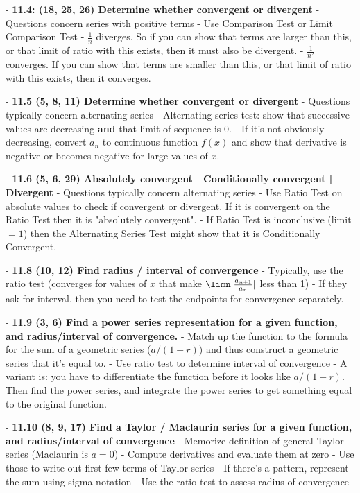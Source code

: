 - \textbf{11.4: (18, 25, 26) Determine whether convergent or divergent}
- Questions concern series with positive terms
- Use Comparison Test or Limit Comparison Test
- $\frac{1}{n}$ diverges. So if you can show that terms are larger than this, or that limit of ratio with this exists, then it must also be divergent.
- $\frac{1}{n^2}$ converges. If you can show that terms are smaller than this, or that limit of ratio with this exists, then it converges.

- \textbf{11.5 (5, 8, 11) Determine whether convergent or divergent}
- Questions typically concern alternating series
- Alternating series test: show that successive values are decreasing \textbf{and} that limit of sequence is 0.
- If it's not obviously decreasing, convert $a_n$ to continuous function $f(x)$ and show that derivative is negative or becomes negative for large values of $x$.

- \textbf{11.6 (5, 6, 29) Absolutely convergent | Conditionally convergent | Divergent}
- Questions typically concern alternating series
- Use Ratio Test on absolute values to check if convergent or divergent. If it is convergent on the Ratio Test then it is "absolutely convergent".
- If Ratio Test is inconclusive (limit $= 1$) then the Alternating Series Test might show that it is Conditionally Convergent.

- \textbf{11.8 (10, 12) Find radius / interval of convergence}
- Typically, use the ratio test (converges for values of $x$ that make $\limn |\frac{a_{n+1}}{a_n}|$ less than 1)
- If they ask for interval, then you need to test the endpoints for convergence separately.

- \textbf{11.9 (3, 6) Find a power series representation for a given function, and radius/interval of convergence.}
- Match up the function to the formula for the sum of a geometric series ($a/(1-r)$) and thus construct a geometric series that it's equal to.
- Use ratio test to determine interval of convergence
- A variant is: you have to differentiate the function before it looks like $a/(1-r)$. Then find the power series, and integrate the power series to get something equal to the original function.

- \textbf{11.10 (8, 9, 17) Find a Taylor / Maclaurin series for a given function, and radius/interval of convergence}
- Memorize definition of general Taylor series (Maclaurin is $a=0$)
- Compute derivatives and evaluate them at zero
- Use those to write out first few terms of Taylor series
- If there's a pattern, represent the sum using sigma notation
- Use the ratio test to assess radius of convergence
